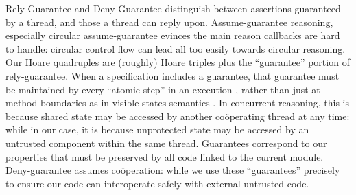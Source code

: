Rely-Guarantee
\cite{relyGuarantee-HayesJones-setss2017,relyGuarantee-vanStaden-mpc2015}
and Deny-Guarantee \cite{DenyGuarantee} %
distinguish between assertions guaranteed by a thread, and those a
thread can reply upon.%
Assume-guarantee
reasoning, especially circular
assume-guarantee  \cite{circular-assume-guarantee-fm2015} evinces
the main reason callbacks
are hard to handle: circular control flow can lead
all too easily towards circular reasoning.
Our Hoare quadruples are (roughly) Hoare triples plus 
the ``guarantee'' portion of rely-guarantee.
When a
specification includes a guarantee, that guarantee must be maintained
by every ``atomic step'' in an execution
\cite{relyGuarantee-HayesJones-setss2017}, rather than just at method
boundaries as in visible states semantics
\cite{MuellerPoetzsch-HeffterLeavens06,DrossoFrancaMuellerSummers08,considerate}.
%
In concurrent reasoning,%
this is because shared state may be accessed
by another co{\"o}perating thread at any time:
while in our case, it is because unprotected
state may be accessed by an untrusted component within the same
thread.  Guarantees correspond to our
properties that must be preserved by all code linked to the current
module. Deny-guarantee assumes
co{\"o}peration:
while we use these ``guarantees'' precisely to
ensure our code can interoperate safely with external untrusted code.

















